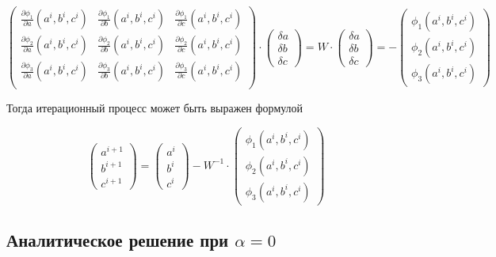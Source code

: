 \documentclass[a4paper,12pt]{article}
\begin{document}
\begin{equation*}
  \begin{pmatrix} 
    \frac{\partial \phi_1}{\partial a}(a^i,b^i,c^i)&\frac{\partial \phi_1}{\partial b}(a^i,b^i,c^i)&\frac{\partial \phi_1}{\partial c}(a^i,b^i,c^i)\\
    \frac{\partial \phi_2}{\partial a}(a^i,b^i,c^i)&\frac{\partial \phi_2}{\partial b}(a^i,b^i,c^i)&\frac{\partial \phi_2}{\partial c}(a^i,b^i,c^i)\\
    \frac{\partial \phi_3}{\partial a}(a^i,b^i,c^i)&\frac{\partial \phi_3}{\partial b}(a^i,b^i,c^i)&\frac{\partial \phi_3}{\partial c}(a^i,b^i,c^i)\\
  \end{pmatrix} \cdot \begin{pmatrix}
    \delta a\\
    \delta b\\
    \delta c
  \end{pmatrix} =W\cdot\begin{pmatrix}
    \delta a\\
    \delta b\\
    \delta c
  \end{pmatrix} = -\begin{pmatrix}
    \phi_1(a^i,b^i,c^i)\\
    \phi_2(a^i,b^i,c^i)\\
    \phi_3(a^i,b^i,c^i)
  \end{pmatrix}
\end{equation*}

Тогда итерационный процесс может быть выражен формулой

\begin{equation*}
  \begin{pmatrix}
    a^{i+1}\\
    b^{i+1}\\
    c^{i+1}
  \end{pmatrix}=\begin{pmatrix}
    a^{i}\\
    b^{i}\\
    c^{i}
  \end{pmatrix}-W^{-1}\cdot \begin{pmatrix}
    \phi_1(a^i,b^i,c^i)\\
    \phi_2(a^i,b^i,c^i)\\
    \phi_3(a^i,b^i,c^i)
  \end{pmatrix}
\end{equation*}

\subsection*{Аналитическое решение при
\(\alpha=0\)}
\end{document}
